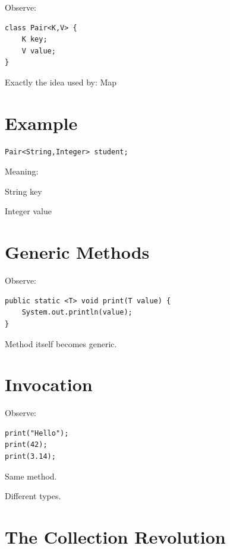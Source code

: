\documentclass[11pt,a4paper]{book}
\begin{document}
Observe:

\begin{verbatim} 
class Pair<K,V> {
    K key;
    V value;
}
\end{verbatim}

Exactly the idea used by:
\textcolor{RosettaJade}{Map}

\section{Example}

\begin{verbatim} 
Pair<String,Integer> student;
\end{verbatim}

Meaning:

\textcolor{RosettaDeepGreen}{String} \textcolor{RosettaOrange}{key}

\textcolor{RosettaDeepGreen}{Integer} \textcolor{RosettaRoyalPurple}{value}

\section{Generic Methods}

Observe:

\begin{verbatim} 
public static <T> void print(T value) {
    System.out.println(value);
}
\end{verbatim}

Method itself becomes generic.

\section{Invocation}

Observe:

\begin{verbatim} 
print("Hello");
print(42);
print(3.14);
\end{verbatim}

Same method.

Different types.

\section{The Collection Revolution}
\end{document}
